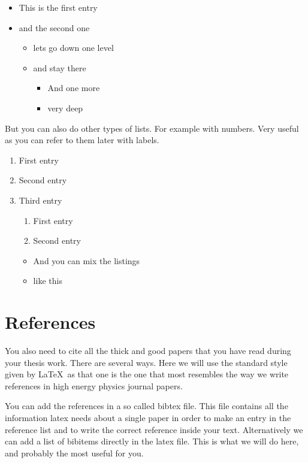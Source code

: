\documentclass[a4paper,12pt]{article}
\begin{document}
\begin{itemize}
\item This is the first entry
\item and the second one
  \begin{itemize}
    \item lets go down one level
    \item and stay there
      \begin{itemize}
          \item And one more
          \item very deep
      \end{itemize}
  \end{itemize}
\end{itemize}

But you can also do other types of lists. For example with numbers. Very useful
as you can refer to them later with labels.

\begin{enumerate}
  \item First entry
  \item Second entry
  \item Third entry
    \begin{enumerate} 
  \item First entry \label{label:item}
  \item Second entry
  \end{enumerate}
      \begin{itemize}
          \item And you can mix the listings
          \item like this 
      \end{itemize}
\end{enumerate}     


\section{References}
\setcounter{equation}{0}
\label{sect:refs}

You also need to cite all the thick and good papers that you have read during
your thesis work. There are several ways. Here we will use the 
standard style given by \LaTeX\ 
as that one is the one that most resembles the way we write references in
high energy physics journal papers. 

You can add the references in a so called bibtex file. This file contains all
the information latex needs about a single paper in order to make an entry in
the reference list and to write the correct reference inside your text. 
Alternatively we can add a list of bibitems directly in the latex file. This
is what we will do here, and probably the most useful for you.
\end{document}
